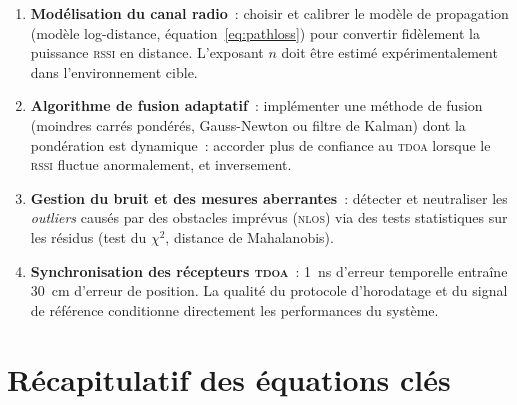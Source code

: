 \documentclass[12pt, a4paper]{article}
\newcommand{\TDOA}{\textsc{tdoa}}
\newcommand{\RSSI}{\textsc{rssi}}
\newcommand{\NLOS}{\textsc{nlos}}
\begin{document}
\begin{enumerate}[label=\textbf{\arabic*.}]
  \item \textbf{Modélisation du canal radio}~: choisir et calibrer le modèle de
        propagation (modèle log-distance,
        équation~\eqref{eq:pathloss}) pour convertir fidèlement la puissance
        \RSSI{} en distance. L'exposant $n$ doit être estimé expérimentalement
        dans l'environnement cible.

  \item \textbf{Algorithme de fusion adaptatif}~: implémenter une méthode de
        fusion (moindres carrés pondérés, Gauss-Newton ou filtre de Kalman)
        dont la pondération est dynamique~: accorder plus de confiance au
        \TDOA{} lorsque le \RSSI{} fluctue anormalement, et inversement.

  \item \textbf{Gestion du bruit et des mesures aberrantes}~: détecter et
        neutraliser les \textit{outliers} causés par des obstacles imprévus
        (\NLOS{}) via des tests statistiques sur les résidus (test du $\chi^2$,
        distance de Mahalanobis).

  \item \textbf{Synchronisation des récepteurs \TDOA{}}~: 1~ns d'erreur
        temporelle entraîne 30~cm d'erreur de position. La qualité du protocole
        d'horodatage et du signal de référence conditionne directement les
        performances du système.
\end{enumerate}

\section*{Récapitulatif des équations clés}
\end{document}
